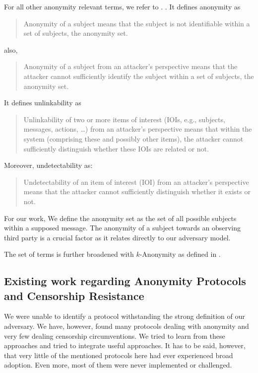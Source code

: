 \documentclass[10pt,journal,compsoc]{IEEEtran}
\begin{document}
For all other anonymity relevant terms, we refer to \cite{anon_terminology}.
. It defines anonymity as 

\begin{quote}
	Anonymity of a subject means that the subject is not identifiable within a set of subjects, the anonymity set.\omitted
\end{quote}
also,
\begin{quote}
	Anonymity of a subject from an attacker's perspective means that the attacker cannot sufficiently identify the subject within a set of subjects, the anonymity set.\omitted
\end{quote}

It defines unlinkability as

\begin{quote}
	Unlinkability of two or more items of interest (IOIs, e.g., subjects, messages, actions, \ldots) from an attacker’s perspective means that within the system (comprising these and possibly other items), the attacker cannot sufficiently distinguish whether these IOIs are related or not.\omitted
\end{quote}

Moreover, undetectability as:
\begin{quote}
	Undetectability of an item of interest (IOI) from an attacker’s perspective means that the attacker cannot  sufficiently distinguish whether it exists or not.
\end{quote}

For our work, We define the anonymity set as the set of all possible subjects within a supposed message. The anonymity of a subject towards an observing third party is a crucial factor as it relates directly to our adversary model.

The set of terms is further broadened with $k$-Anonymity as defined in \cite{k-anonymous:ccs2003}.

\subsection{Existing work regarding Anonymity Protocols and Censorship Resistance}
We were unable to identify a protocol withstanding the strong definition of our adversary. We have, however, found many protocols dealing with anonymity and very few dealing censorship circumventions. We tried to learn from these approaches and tried to integrate useful approaches. It has to be said, however, that very little of the mentioned protocols here had ever experienced broad adoption. Even more, most of them were never implemented or challenged. 
\end{document}

